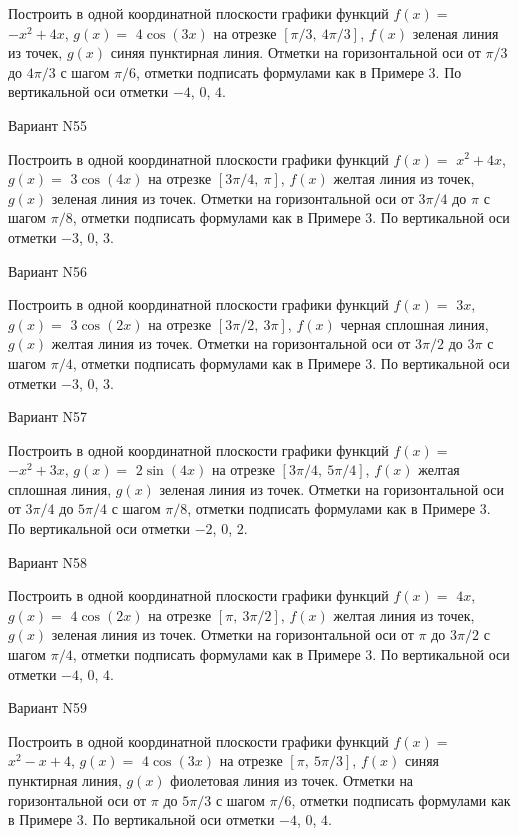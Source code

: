 \documentclass[11pt]{report}
\begin{document}
Построить в одной координатной плоскости графики функций $f(x) = $
    $- x^{2} + 4 x$, $g(x) = $
    $4 \cos{\left(3 x \right)}$ на 
    отрезке $\left[ \pi / 3, \  4 \pi / 3\right]$, $f(x)$ зеленая 
    линия из точек, $g(x)$ синяя пунктирная линия. 
    Отметки на горизонтальной оси от $\pi / 3$ до $4 \pi / 3$ с 
    шагом $\pi / 6$, отметки подписать формулами как в Примере 3.  
    По вертикальной оси отметки $-4$, 0, $4$.

Вариант N55

Построить в одной координатной плоскости графики функций $f(x) = $
    $x^{2} + 4 x$, $g(x) = $
    $3 \cos{\left(4 x \right)}$ на 
    отрезке $\left[ 3 \pi / 4, \  \pi\right]$, $f(x)$ желтая 
    линия из точек, $g(x)$ зеленая линия из точек. 
    Отметки на горизонтальной оси от $3 \pi / 4$ до $\pi$ с 
    шагом $\pi / 8$, отметки подписать формулами как в Примере 3.  
    По вертикальной оси отметки $-3$, 0, $3$.

Вариант N56

Построить в одной координатной плоскости графики функций $f(x) = $
    $3 x$, $g(x) = $
    $3 \cos{\left(2 x \right)}$ на 
    отрезке $\left[ 3 \pi / 2, \  3 \pi\right]$, $f(x)$ черная 
    сплошная линия, $g(x)$ желтая линия из точек. 
    Отметки на горизонтальной оси от $3 \pi / 2$ до $3 \pi$ с 
    шагом $\pi / 4$, отметки подписать формулами как в Примере 3.  
    По вертикальной оси отметки $-3$, 0, $3$.

Вариант N57

Построить в одной координатной плоскости графики функций $f(x) = $
    $- x^{2} + 3 x$, $g(x) = $
    $2 \sin{\left(4 x \right)}$ на 
    отрезке $\left[ 3 \pi / 4, \  5 \pi / 4\right]$, $f(x)$ желтая 
    сплошная линия, $g(x)$ зеленая линия из точек. 
    Отметки на горизонтальной оси от $3 \pi / 4$ до $5 \pi / 4$ с 
    шагом $\pi / 8$, отметки подписать формулами как в Примере 3.  
    По вертикальной оси отметки $-2$, 0, $2$.

Вариант N58

Построить в одной координатной плоскости графики функций $f(x) = $
    $4 x$, $g(x) = $
    $4 \cos{\left(2 x \right)}$ на 
    отрезке $\left[ \pi, \  3 \pi / 2\right]$, $f(x)$ желтая 
    линия из точек, $g(x)$ зеленая линия из точек. 
    Отметки на горизонтальной оси от $\pi$ до $3 \pi / 2$ с 
    шагом $\pi / 4$, отметки подписать формулами как в Примере 3.  
    По вертикальной оси отметки $-4$, 0, $4$.

Вариант N59

Построить в одной координатной плоскости графики функций $f(x) = $
    $x^{2} - x + 4$, $g(x) = $
    $4 \cos{\left(3 x \right)}$ на 
    отрезке $\left[ \pi, \  5 \pi / 3\right]$, $f(x)$ синяя 
    пунктирная линия, $g(x)$ фиолетовая линия из точек. 
    Отметки на горизонтальной оси от $\pi$ до $5 \pi / 3$ с 
    шагом $\pi / 6$, отметки подписать формулами как в Примере 3.  
    По вертикальной оси отметки $-4$, 0, $4$.
\end{document}
